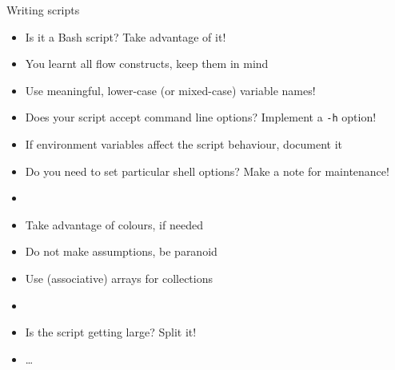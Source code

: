 
\begin{frame}{Writing scripts\hfill{\small{}}}
    \vspace{-2mm}
    \begin{itemize}
        \item Is it a Bash script? Take advantage of it! 
        \item You learnt all flow constructs, keep them in mind
        \item Use meaningful, lower-case (or mixed-case) variable names!
        \item Does your script accept command line options? Implement a \texttt{-h} option!
        \item If environment variables affect the script behaviour, document it
        \item Do you need to set particular shell options? Make a note for maintenance!
        \item {}
        \item Take advantage of colours, if needed
        \item Do not make assumptions, be paranoid
        \item Use (associative) arrays for collections
        \item {}
        \item Is the script getting large? Split it! 
        \item \ldots
    \end{itemize}
\end{frame}
